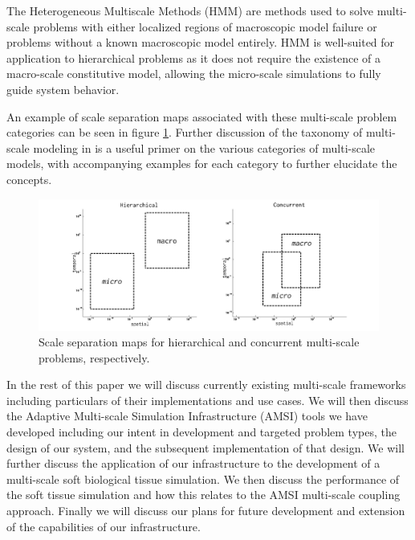 \documentclass[review]{siamart1116}
\begin{document}
The Heterogeneous Multiscale Methods (HMM) \cite{weinan2003heterogenous,weinan2007heterogeneous} are methods used to solve multi-scale problems with either localized regions of macroscopic model failure or problems without a known macroscopic model entirely. HMM is well-suited for application to hierarchical problems as it does not require the existence of a macro-scale constitutive model, allowing the micro-scale simulations to fully guide system behavior.


An example of scale separation maps \cite{borgdorff2013foundations} associated with these multi-scale problem categories can be seen in figure \ref{fig:scale-map}. Further discussion of the taxonomy of multi-scale modeling in \cite{tadmor2011modeling} is a useful primer on the various categories of multi-scale models, with accompanying examples for each category to further elucidate the concepts. 

\begin{figure}
  \centering
  \includegraphics[width=.9\columnwidth]{scale-separation-map}
  \caption{Scale separation maps for hierarchical and concurrent multi-scale problems, respectively.}
  \label{fig:scale-map}
\end{figure}

In the rest of this paper we will discuss currently existing multi-scale frameworks including particulars of their implementations and use cases. We will then discuss the Adaptive Multi-scale Simulation Infrastructure (AMSI) tools we have developed including our intent in development and targeted problem types, the design of our system, and the subsequent implementation of that design. We will further discuss the application of our infrastructure to the development of a multi-scale soft biological tissue simulation. We then discuss the performance of the soft tissue simulation and how this relates to the AMSI multi-scale coupling approach. Finally we will discuss our plans for future development and extension of the capabilities of our infrastructure.
\end{document}
